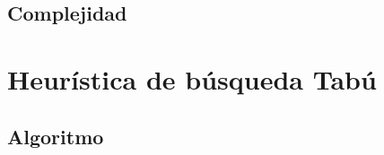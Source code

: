 \documentclass[a4paper, 10pt, twoside]{article}
\begin{document}
\subsection{Complejidad}



\newpage

\section{Heurística de búsqueda Tabú}
\subsection{Algoritmo}
\end{document}
